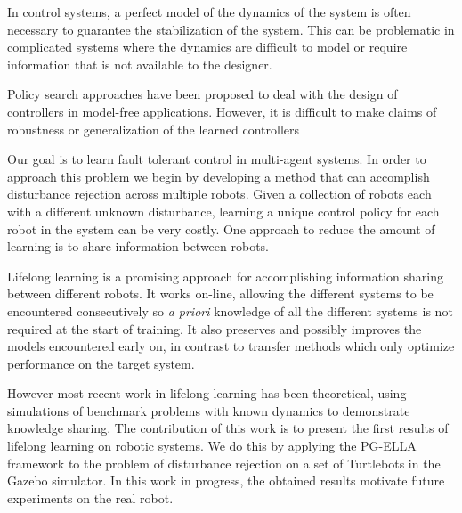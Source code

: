 \documentclass{aamas2016}
\begin{document}
%

In control systems, a perfect model of the dynamics of the system is often necessary to guarantee the stabilization of the system. This can be problematic in complicated systems where the dynamics are difficult to model or require information that is not available to the designer. %


Policy search approaches have been proposed to deal with the design of controllers in model-free applications.
However, it is difficult to make claims of robustness or generalization of the learned controllers 

Our goal is to learn fault tolerant control in multi-agent systems. In order to approach this problem we begin by developing a method that can accomplish disturbance rejection across multiple robots. 
Given a collection of robots each with a different unknown disturbance, learning a unique control policy for each robot in the system can be very costly. One approach to reduce the amount of learning is to share information between robots. 

Lifelong learning \cite{Ruvolo2013} is a promising approach for accomplishing information sharing between different robots. It works on-line, allowing the different systems to be encountered consecutively so \textit{a priori} knowledge of all the different systems is not required at the start of training. It also preserves and possibly improves the models encountered early on, in contrast to transfer methods which only optimize performance on the target system.

However most recent work in lifelong learning \cite{Ruvolo2013,BouAmmar2014a,bouAmmar2015unsupervised} has been theoretical, using simulations of benchmark problems with known dynamics to demonstrate knowledge sharing. The contribution of this work is to present the first results of lifelong learning on robotic systems. We do this by applying the PG-ELLA framework \cite{BouAmmar2014a} to the problem of disturbance rejection on a set of Turtlebots in the Gazebo simulator. In this work in progress, the obtained results motivate future experiments on the real robot. 
\end{document}
